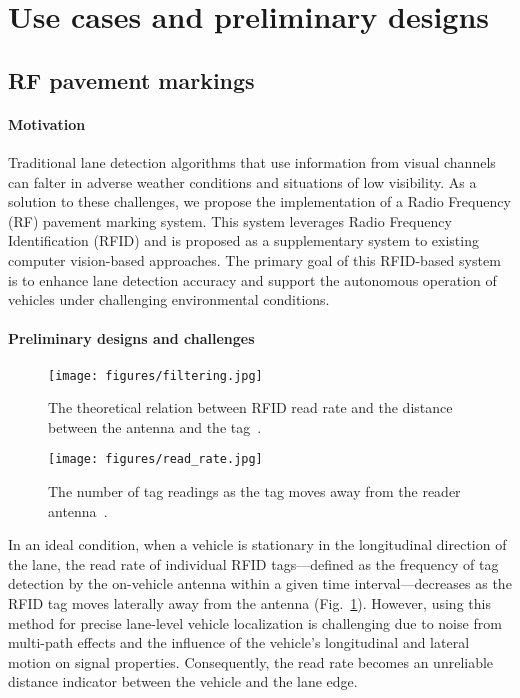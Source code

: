 \documentclass[lettersize,journal]{IEEEtran}
\begin{document}
\section{Use cases and preliminary designs}
\subsection{RF pavement markings}
\paragraph{Motivation}
Traditional lane detection algorithms that use information from visual channels can falter in adverse weather conditions and situations of low visibility. As a solution to these challenges, we propose the implementation of a Radio Frequency (RF) pavement marking system. This system leverages Radio Frequency Identification (RFID) and is proposed as a supplementary system to existing computer vision-based approaches. The primary goal of this RFID-based system is to enhance lane detection accuracy and support the autonomous operation of vehicles under challenging environmental conditions.

\paragraph{Preliminary designs and challenges}
\begin{figure}[tb!]
\centerline{\texttt{[image: figures/filtering.jpg]}}
\caption{The theoretical relation between RFID read rate and the distance between the antenna and the tag~\cite{suo2023rf}.}
\label{fig:filtering}
\end{figure} 

\begin{figure}[tb!]
\centerline{\texttt{[image: figures/read\_rate.jpg]}}
\caption{The number of tag readings as the tag moves away from the reader antenna~\cite{suo2023rf}.}
\label{fig:readrate}
\end{figure}

In an ideal condition, when a vehicle is stationary in the longitudinal direction of the lane, the read rate of individual RFID tags—defined as the frequency of tag detection by the on-vehicle antenna within a given time interval—decreases as the RFID tag moves laterally away from the antenna (Fig.~\ref{fig:filtering}). However, using this method for precise lane-level vehicle localization is challenging due to noise from multi-path effects and the influence of the vehicle's longitudinal and lateral motion on signal properties. Consequently, the read rate becomes an unreliable distance indicator between the vehicle and the lane edge.
\end{document}
